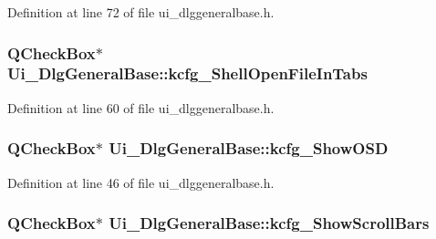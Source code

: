 Definition at line 72 of file ui\+\_\+dlggeneralbase.\+h.

\hypertarget{classUi__DlgGeneralBase_abb932ae5a296f99d600ae0bd76423797}{
\subsubsection[{kcfg\+\_\+\+Shell\+Open\+File\+In\+Tabs}]{\setlength{\rightskip}{0pt plus 5cm}Q\+Check\+Box$\ast$ Ui\+\_\+\+Dlg\+General\+Base\+::kcfg\+\_\+\+Shell\+Open\+File\+In\+Tabs}}\label{classUi__DlgGeneralBase_abb932ae5a296f99d600ae0bd76423797}


Definition at line 60 of file ui\+\_\+dlggeneralbase.\+h.

\hypertarget{classUi__DlgGeneralBase_a15d077fb29bfbb39a64bf54cccb9a0d3}{
\subsubsection[{kcfg\+\_\+\+Show\+O\+S\+D}]{\setlength{\rightskip}{0pt plus 5cm}Q\+Check\+Box$\ast$ Ui\+\_\+\+Dlg\+General\+Base\+::kcfg\+\_\+\+Show\+O\+S\+D}}\label{classUi__DlgGeneralBase_a15d077fb29bfbb39a64bf54cccb9a0d3}


Definition at line 46 of file ui\+\_\+dlggeneralbase.\+h.

\hypertarget{classUi__DlgGeneralBase_a58a8f3825a9f66542cd2e6e7e6e66ee9}{
\subsubsection[{kcfg\+\_\+\+Show\+Scroll\+Bars}]{\setlength{\rightskip}{0pt plus 5cm}Q\+Check\+Box$\ast$ Ui\+\_\+\+Dlg\+General\+Base\+::kcfg\+\_\+\+Show\+Scroll\+Bars}}\label{classUi__DlgGeneralBase_a58a8f3825a9f66542cd2e6e7e6e66ee9}


